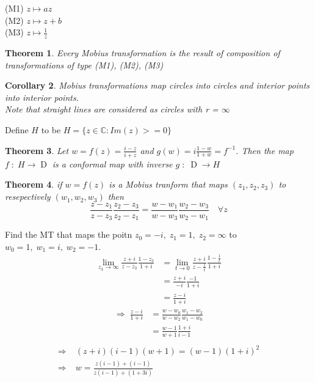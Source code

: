 \documentclass{article}
\newtheorem{theorem}{Theorem}[section]
\newtheorem{corollary}[theorem]{Corollary}
\newenvironment{definition}[1][Definition]{\begin{trivlist}
\item[\hskip \labelsep {\bfseries #1}]}{\end{trivlist}}
\newenvironment{example}[1][Example]{\begin{trivlist}
\item[\hskip \labelsep {\bfseries #1}]}{\end{trivlist}}
\newcommand{\C}{\mathbb{C}}
\begin{document}
\begin{definition}
    (M1) $z \mapsto az$\\
    (M2) $z \mapsto z + b$\\
    (M3) $z \mapsto \frac{1}{z}$
\end{definition}

\begin{theorem}
    Every Mobius transformation is the result of composition of transformations of type (M1), (M2), (M3)
\end{theorem}

\begin{corollary}
    Mobius transformations map circles into circles and interior points into interior points.\\
    \textit{Note that straight lines are considered as circles with r = $\infty$}
\end{corollary}

Define $H$ to be $H=\{z \in \C: Im(z) >= 0\}$
\begin{theorem}
    Let $w = f(z) = \frac{i-z}{i+z}$ and $g(w) = i\frac{1-w}{1+w} = f^{-1}$. Then the map $f \; : \; H \rightarrow \operatorname{D}$ is a conformal map with inverse $g\; : \; \operatorname{D}\rightarrow H$
\end{theorem}

\begin{theorem}
    if $w = f(z)$ is a Mobius tranform that maps $(z_1, z_2, z_3)$ to resepectively $(w_1, w_2, w_3)$ then
    \[\frac{z-z_1}{z-z_3}\frac{z_2-z_3}{z_2-z_1} = \frac{w-w_1}{w-w_3}\frac{w_2-w_3}{w_2-w_1} \quad \forall z\]
\end{theorem}

\begin{example}
    Find the MT that maps the poitn $z_0 = -i,\; z_1 = 1,\; z_2 = \infty$ to $w_0 = 1, \; w_1 = i,\; w_2 = -1$.
\begin{align*}
    \lim_{z_3 \rightarrow \infty} \frac{z+i}{z-z_3}\frac{1-z_3}{1+i}
        &= \lim_{t \rightarrow 0}\frac{z+i}{z-\frac{1}{t}} \frac{1-\frac{1}{t}}{1+i}\\
        &= \frac{z + i}{-i}\frac{-1}{1+i}\\
        &= \frac{z-i}{1+i}
\end{align*}
\begin{align*}
    \Rightarrow \; \frac{z-i}{1+i}
        &= \frac{w-w_0}{w-w_2}\frac{w_1-w_2}{w_1-w_0}\\
        &= \frac{w-1}{w+1}\frac{1+i}{i-1}\\
\end{align*}
\begin{align*}
    \Rightarrow& 
        \; (z+i)(i-1)(w+1) = (w-1)(1+i)^2\\
    \Rightarrow&
        \; w = \frac{z(i-1)+(i-1)}{z(i-1) + (1+3i)}
\end{align*}
\end{example}
\end{document}
